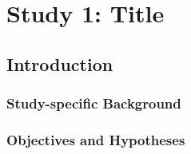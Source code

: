 \chapter{Study 1: Title}
\label{ch:study1}


\section{Introduction}
\label{sec:study1-introduction}

\subsection{Study-specific Background}
\label{subsec:study1-background}
\mbox{}\par

\subsection{Objectives and Hypotheses}
\label{subsec:study1-objectives}
\mbox{}\par

